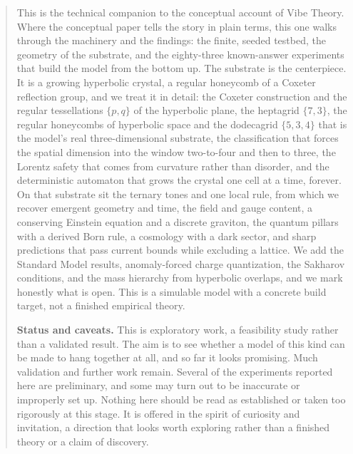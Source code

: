 \begin{abstract}
This is the technical companion to the conceptual account of Vibe Theory. Where the conceptual
paper tells the story in plain terms, this one walks through the machinery and the findings: the
finite, seeded testbed, the geometry of the substrate, and the eighty-three known-answer
experiments that build the model from the bottom up. The substrate is the centerpiece. It is a
growing hyperbolic crystal, a regular honeycomb of a Coxeter reflection group, and we treat it in
detail: the Coxeter construction and the regular tessellations $\{p,q\}$ of the hyperbolic plane,
the heptagrid $\{7,3\}$, the regular honeycombs of hyperbolic space and the dodecagrid $\{5,3,4\}$
that is the model's real three-dimensional substrate, the classification that forces the spatial
dimension into the window two-to-four and then to three, the Lorentz safety that comes from
curvature rather than disorder, and the deterministic automaton that grows the crystal one cell at
a time, forever. On that substrate sit the ternary tones and one local rule, from which we recover
emergent geometry and time, the field and gauge content, a conserving Einstein equation and a
discrete graviton, the quantum pillars with a derived Born rule, a cosmology with a dark sector,
and sharp predictions that pass current bounds while excluding a lattice. We add the Standard Model
results, anomaly-forced charge quantization, the Sakharov conditions, and the mass hierarchy from
hyperbolic overlaps, and we mark honestly what is open. This is a simulable model with a concrete
build target, not a finished empirical theory.
\medskip

\noindent\textbf{Status and caveats.} This is exploratory work, a feasibility study rather than a validated result. The aim is to see whether a model of this kind can be made to hang together at all, and so far it looks promising. Much validation and further work remain. Several of the experiments reported here are preliminary, and some may turn out to be inaccurate or improperly set up. Nothing here should be read as established or taken too rigorously at this stage. It is offered in the spirit of curiosity and invitation, a direction that looks worth exploring rather than a finished theory or a claim of discovery.
\end{abstract}
